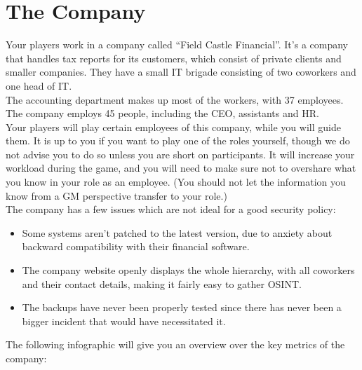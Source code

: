 \section{The Company}

Your players work in a company called \enquote{Field Castle Financial}.
 It's a company that handles tax reports for its customers, which consist of private clients and smaller companies.
They have a small IT brigade consisting of two coworkers and one head of IT.
\\

The accounting department makes up most of the workers, with 37 employees.
The company employs 45 people, including the CEO, assistants and HR.
\\

Your players will play certain employees of this company, while you will guide them.
It is up to you if you want to play one of the roles yourself, though we do not advise you to do so unless you are short on participants.
It will increase your workload during the game, and you will need to make sure not to overshare what you know in your role as an employee.
(You should not let the information you know from a GM perspective transfer to your role.)
\\

The company has a few issues which are not ideal for a good security policy:

\begin{itemize}
    \item Some systems aren't patched to the latest version, due to anxiety about backward compatibility with their financial software.
    \item The company website openly displays the whole hierarchy, with all coworkers and their contact details, making it fairly easy to gather OSINT.
    \item The backups have never been properly tested since there has never been a bigger incident that would have necessitated it.
\end{itemize}

The following infographic will give you an overview over the key metrics of the company: